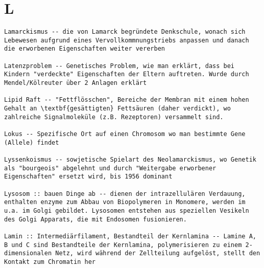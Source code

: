 \documentclass{article}
\begin{document}
\section{L}
\begin{verbatim}
Lamarckismus -- die von Lamarck begründete Denkschule, wonach sich Lebewesen aufgrund eines Vervollkommnungstriebs anpassen und danach die erworbenen Eigenschaften weiter vererben

Latenzproblem -- Genetisches Problem, wie man erklärt, dass bei Kindern "verdeckte" Eigenschaften der Eltern auftreten. Wurde durch Mendel/Kölreuter über 2 Anlagen erklärt

Lipid Raft -- "Fettflösschen", Bereiche der Membran mit einem hohen Gehalt an \textbf{gesättigten} Fettsäuren (daher verdickt), wo zahlreiche Signalmoleküle (z.B. Rezeptoren) versammelt sind.

Lokus -- Spezifische Ort auf einen Chromosom wo man bestimmte Gene (Allele) findet

Lyssenkoismus -- sowjetische Spielart des Neolamarckismus, wo Genetik als "bourgeois" abgelehnt und durch "Weitergabe erworbener Eigenschaften" ersetzt wird, bis 1956 dominant

Lysosom :: bauen Dinge ab -- dienen der intrazellulären Verdauung, enthalten enzyme zum Abbau von Biopolymeren in Monomere, werden im u.a. im Golgi gebildet. Lysosomen entstehen aus speziellen Vesikeln des Golgi Apparats, die mit Endosomen fusionieren.

Lamin :: Intermediärfilament, Bestandteil der Kernlamina -- Lamine A, B und C sind Bestandteile der Kernlamina, polymerisieren zu einem 2-dimensionalen Netz, wird während der Zellteilung aufgelöst, stellt den Kontakt zum Chromatin her



\end{verbatim}
\newpage
\end{document}
